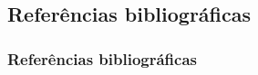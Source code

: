 \documentclass[hyperref={colorlinks=true,    
allcolors = blue,citecolor=blue}]{beamer} %
\begin{document}
\begin{frame}[allowframebreaks]
\section{Referências bibliográficas}
\frametitle{Referências bibliográficas}  
      
    
    
\end{frame}
\end{document}
